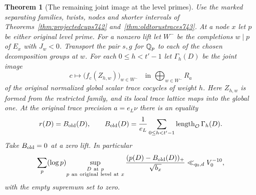 \documentclass[a4paper,11pt]{article}
\newtheorem{theorem}[proposition]{Theorem}
\theoremstyle{definition}
\theoremstyle{remark}
\numberwithin{equation}{section}
\begin{document}
\begin{theorem}[The remaining joint image at the level primes]
\leavevmode\label{thm:oldcolumn745}
Use the marked separating families, twists, nodes and shorter
intervals of Theorems~\ref{thm:projectedcups742}
and~\ref{thm:oldtorustraces743}. At a node \(x\) let \(p\) be
either original level prime. For a nonzero lift let \(W^-\) be
the completions \(w\mid p\) of \(E_x\) with \(J_w<0\).
Transport the pair \(s,g\) for \(\mathbb Q_p\) to each of the chosen
decomposition groups at \(w\). For each \(0\le h<t'-1\) let
\(\Gamma_h(D)\) be the joint image
\[
  c\longmapsto\big(f_c(Z_{h,w})\big)_{w\in W^-}
                \quad\text{in }\bigoplus_{w\in W^-} R_a
\]
of the original normalized global scalar trace cocycles of weight
\(h\). Here \(Z_{h,w}\) is formed from the restricted family,
and its local trace lattice maps into the global one.
At the original trace precision \(a=e_L\nu\) there is an equality
\[
       r(D)=B_{\rm old}(D),\qquad
       B_{\rm old}(D)=\frac1{e_L}\sum_{0\le h<t'-1}
                             \operatorname{length}_{\mathcal O}\Gamma_h(D).
\]
Take \(B_{\rm old}=0\) at a zero lift. In particular
\[
  \sum_p(\log p)\!
  \sup_{\substack{D\ {\rm at}\ p\\p\ {\rm an\ original\ level\ at}\ x}}
       \frac{(p(D)-B_{\rm old}(D))_+}{\sqrt{b_x}}
          \ll_{q_0,d} V_0^{-10},
\]
with the empty supremum set to zero.
\end{theorem}
\end{document}
